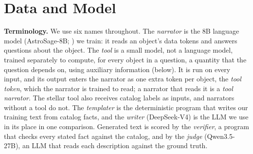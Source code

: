 \section{Data and Model}
\label{sec:data}
\textbf{Terminology.} We use six names throughout. The \emph{narrator} is
the 8B language model (AstroSage-8B; \cite{haan2025_astrosage}) we train: it reads an object's data tokens and answers questions
about the object. The \emph{tool} is a small model, not a language model,
trained separately to compute, for every object in a question, a quantity that
the question depends on, using auxiliary information (below). It is run on every input, and its
output enters the narrator as one extra token per object, the \emph{tool token},
which the narrator is trained to read; a narrator that reads it is a \emph{tool
narrator}. The stellar tool also receives catalog labels as inputs, and narrators without a tool do not. The \emph{templater} is the deterministic program that writes
our training text from catalog facts, and the \emph{writer} (DeepSeek-V4) is the
LLM we use in its place in one comparison. Generated text is scored by the
\emph{verifier}, a program that checks every stated fact against the catalog, and
by the \emph{judge} (Qwen3.5-27B), an LLM that reads each description against
the ground truth.

